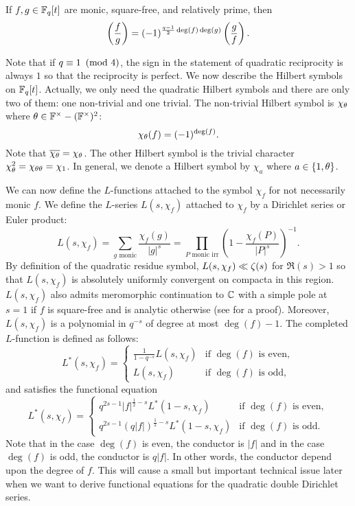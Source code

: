 \documentclass[12pt,reqno,oneside]{amsart}
\begin{document}
    \begin{theorem}
        If $f,g \in \mathbb{F}_{q}[t]$ are monic, square-free, and relatively prime, then
        \[
            \left(\frac{f}{g}\right) = (-1)^{\frac{q-1}{2}\deg(f)\deg(g)}\left(\frac{g}{f}\right).
        \]
    \end{theorem}

    Note that if $q \equiv 1 \ \left(\text{mod }4\right)$, the sign in the statement of quadratic reciprocity is always $1$ so that the reciprocity is perfect. We now describe the Hilbert symbols on $\mathbb{F}_{q}[t]$. Actually, we only need the quadratic Hilbert symbols and there are only two of them: one non-trivial and one trivial. The non-trivial Hilbert symbol is $\chi_{\theta}$ where $\theta \in \mathbb{F}^{\times}-(\mathbb{F}^{\times})^{2}$:
    \[
        \chi_{\theta}(f) = (-1)^{\deg(f)}.
    \]
    Note that $\overline{\chi_{\theta}} = \chi_{\theta}$. The other Hilbert symbol is the trivial character $\chi_{\theta}^{2} = \chi_{\theta\theta} = \chi_{1}$. In general, we denote a Hilbert symbol by $\chi_{a}$ where $a \in \{1,\theta\}$.

    We can now define the $L$-functions attached to the symbol $\chi_{f}$ for not necessarily monic $f$. We define the $L$-series $L(s,\chi_{f})$ attached to $\chi_{f}$ by a Dirichlet series or Euler product:
    \[
        L(s,\chi_{f}) = \sum_{\text{$g$ monic}}\frac{\chi_{f}(g)}{|g|^{s}} = \prod_{\text{$P$ monic irr}}\left(1-\frac{\chi_{f}(P)}{|P|^{s}}\right)^{-1}.
    \]
    By definition of the quadratic residue symbol, $L(s,\chi_{f}) \ll \zeta(s)$ for $\Re(s) > 1$ so that $L(s,\chi_{f})$ is absolutely uniformly convergent on compacta in this region. $L(s,\chi_{f})$ also admits meromorphic continuation to $\mathbb{C}$ with a simple pole at $s = 1$ if $f$ is square-free and is analytic otherwise (see \cite{R} for a proof). Moreover, $L(s,\chi_{f})$ is a polynomial in $q^{-s}$ of degree at most $\deg(f)-1$. The completed $L$-function is defined as follows:
    \[
        L^{\ast}(s,\chi_{f}) = \begin{cases} \frac{1}{1-q^{-s}}L(s,\chi_{f}) & \text{if $\deg(f)$ is even}, \\ L(s,\chi_{f}) & \text{if $\deg(f)$ is odd}, \end{cases}
    \]
    and satisfies the functional equation
    \[
        L^{\ast}(s,\chi_{f}) = \begin{cases} q^{2s-1}|f|^{\frac{1}{2}-s}L^{\ast}(1-s,\chi_{f}) & \text{if $\deg(f)$ is even}, \\ q^{2s-1}(q|f|)^{\frac{1}{2}-s}L^{\ast}(1-s,\chi_{f}) & \text{if $\deg(f)$ is odd}. \end{cases}
    \]
    Note that in the case $\deg(f)$ is even, the conductor is $|f|$ and in the case $\deg(f)$ is odd, the conductor is $q|f|$. In other words, the conductor depend upon the degree of $f$. This will cause a small but important technical issue later when we want to derive functional equations for the quadratic double Dirichlet series.
\end{document}
